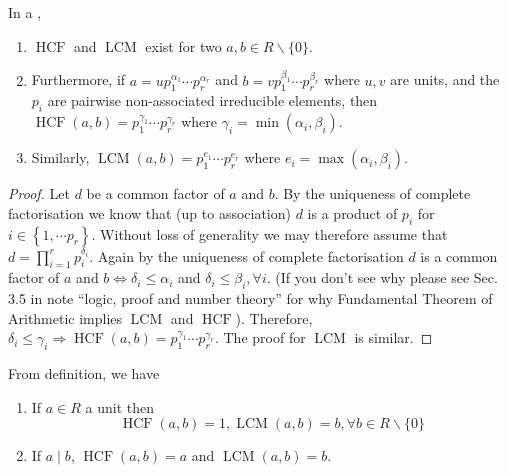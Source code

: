 \documentclass{article}
\newcommand{\HCF}{\operatorname{HCF}}
\newcommand{\LCM}{\operatorname{LCM}}
\begin{document}
\begin{lema}
 In a , 
 \begin{enumerate}
     \item $\HCF$ and $\LCM$ exist for two $a, b \in R \backslash\{0\}$.
     \item Furthermore, if  $a=u p_{1}^{\alpha_{1}} \cdots p_{r}^{\alpha_{r}}$ and $b=v p_{1}^{\beta_{1}} \cdots p_{r}^{\beta_{r}}$ where $u, v$ are units, and the $p_{i}$ are pairwise non-associated irreducible elements, then $\HCF(a, b)=p_{1}^{\gamma_{1}} \cdots p_{r}^{\gamma_{r}}$ where $\gamma_{i}=\min \left(\alpha_{i}, \beta_{i}\right)$.
     \item Similarly, $\LCM(a, b)=p_{1}^{e_{1}} \cdots p_{r}^{e_{r}}$ where $e_{i}=\max \left(\alpha_{i}, \beta_{i}\right)$.
 \end{enumerate}
\end{lema}
\begin{proof}
Let $d$ be a common factor of $a$ and $b$. By the uniqueness of complete factorisation we know that (up to association) $d$ is a product of $p_{i}$ for $i \in\left\{1, \cdots p_{r}\right\}$. Without loss of generality we may therefore assume that $d=\prod_{i=1}^{r} p_{i}^{\delta_{i}}$. Again by the uniqueness of complete factorisation $d$ is a common factor of $a$ and $b \Longleftrightarrow \delta_{i} \leq \alpha_{i}$ and $\delta_{i} \leq \beta_{i}, \forall i$. (If you don't see why please see Sec. 3.5 in note ``logic, proof and number theory'' for why Fundamental Theorem of Arithmetic implies $\LCM$ and $\HCF$). Therefore, $\delta_{i} \leq \gamma_{i} \Rightarrow \HCF(a, b)=p_{1}^{\gamma_{1}} \cdots p_{r}^{\gamma_{r}}$. The proof for $\LCM$ is similar.
\end{proof}

\begin{rema}From definition, we have 
\begin{enumerate}
    \item If $a \in R$ a unit then
$$
\HCF(a, b)=1, \LCM(a, b)=b, \forall b \in R \backslash\{0\}
$$
\item If $a\mid b$, $\HCF(a, b)=a$ and $\LCM(a, b)=b$.
\end{enumerate}
\end{rema}
\end{document}
